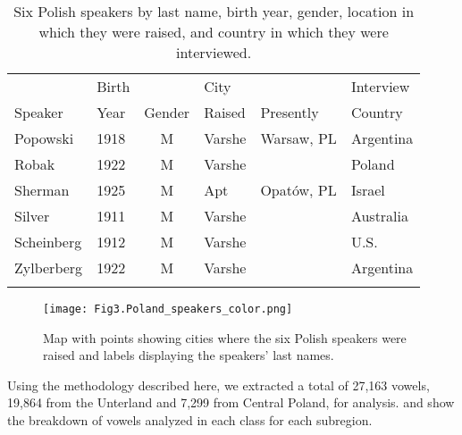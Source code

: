 \documentclass[output=paper,colorlinks,citecolor=brown]{langscibook}
\begin{document}
\begin{table}
\begin{tabular}{llclll}
\lsptoprule
          & Birth  &          & City     &             & Interview\\
{Speaker} & {Year} & {Gender} & {Raised} & {Presently} & {Country}\\
\midrule
Popowski & 1918 & M & Varshe & Warsaw, PL & Argentina\\
Robak & 1922 & M & Varshe &  & Poland\\
Sherman & 1925 & M & Apt & Opatów, PL & Israel\\
Silver & 1911 & M & Varshe &  & Australia\\
Scheinberg & 1912 & M & Varshe &  & U.S.\\
Zylberberg & 1922 & M & Varshe &  & Argentina\\
\lspbottomrule
\end{tabular}
\caption{\label{tab:nove:2} Six Polish speakers by last name, birth year, gender, location in which they were raised, and country in which they were interviewed.}
\end{table}
  
\begin{figure}
\texttt{[image: Fig3.Poland\_speakers\_color.png]}
\caption{\label{fig:nove:3} Map with points showing cities where the six Polish speakers were raised and labels displaying the speakers' last names.}
\end{figure}

Using the methodology described here, we extracted a total of 27,163 vowels, 19,864 from the Unterland and 7,299 from Central Poland, for analysis.  and  show the breakdown of vowels analyzed in each class for each subregion.
\end{document}
